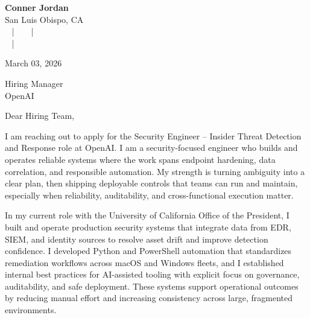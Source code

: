 \documentclass[letterpaper,11pt]{article}
\newcommand{\companyname}{OpenAI}
\begin{document}
\begin{center}
  {\Huge \textbf{Conner Jordan}}\\[4pt]
  {\Large San Luis Obispo, CA}\\[4pt]
  \href{tel:+18059759793}{
    } ~ | ~
  \href{mailto:connercharlesjordan@gmail.com}{
    } ~ | ~
   \\
  \href{https://www.linkedin.com/in/conner-jordan-4b268514a/}{
    } ~ | ~
  \href{https://github.com/cjordan223}{
    }
\end{center}

\vspace{16pt}

\begin{flushright}
March 03, 2026
\end{flushright}

Hiring Manager\\
\companyname

\vspace{26pt}

\noindent
Dear Hiring Team,

\vspace{16pt}

I am reaching out to apply for the Security Engineer \mbox{--} Insider Threat Detection and Response role at OpenAI. I am a security-focused engineer who builds and operates reliable systems where the work spans endpoint hardening, data correlation, and responsible automation. My strength is turning ambiguity into a clear plan, then shipping deployable controls that teams can run and maintain, especially when reliability, auditability, and cross-functional execution matter.

\vspace{16pt}

In my current role with the University of California Office of the President, I built and operate production security systems that integrate data from EDR, SIEM, and identity sources to resolve asset drift and improve detection confidence. I developed Python and PowerShell automation that standardizes remediation workflows across macOS and Windows fleets, and I established internal best practices for AI-assisted tooling with explicit focus on governance, auditability, and safe deployment. These systems support operational outcomes by reducing manual effort and increasing consistency across large, fragmented environments.
\end{document}

